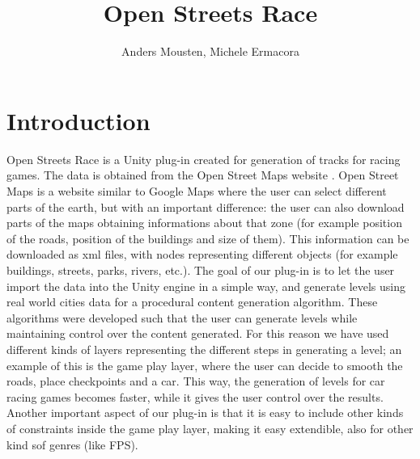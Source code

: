 \documentclass[conference]{IEEEtran}
\begin{document}
\title{\ \\ \LARGE\bf Open Streets Race}

\author{Anders Mousten, Michele Ermacora}


\maketitle

%

\section{Introduction}

Open Streets Race is a Unity \cite{unity} plug-in created for generation of tracks for racing games. The data is obtained from the Open Street Maps website \cite{openstreet}. Open Street Maps is a website similar to Google Maps \cite{gmaps} where the user can select different parts of the earth, but with an important difference: the user can also download parts of the maps obtaining informations about that zone (for example position of the roads, position of the buildings and size of them). This information can be downloaded as xml files, with nodes representing different objects (for example buildings, streets, parks, rivers, etc.). The goal of our plug-in is to let the user import the data into the Unity \cite{unity} engine in a simple way, and generate levels using real world cities data for a procedural content generation algorithm. These algorithms were developed such that the user can generate levels while maintaining control over the content generated. For this reason we have used different kinds of layers representing the different steps in generating a level; an example of this is the game play layer, where the user can decide to smooth the roads, place checkpoints and a car. This way, the generation of levels for car racing games becomes faster, while it gives the user control over the results. Another important aspect of our plug-in is that it is easy to include other kinds of constraints inside the game play layer, making it easy extendible, also for other kind sof genres (like FPS).
\end{document}
